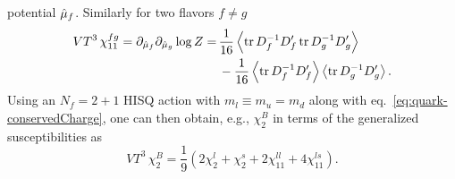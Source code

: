 potential $\hat{\mu}_f$. Similarly for two flavors $f\neq g$ 
\begin{equation}\begin{aligned}
  VT^3\,\chi_{11}^{fg} =\partial_{\muh_f}\partial_{\muh_g}\log Z
                 = \,& \frac{1}{16}\ev{\tr D_f^{-1}D_f'\tr D_g^{-1}D_g'} \\
                   & -\frac{1}{16}\ev{\tr D_f^{-1}D_f'}\ev{\tr D_g^{-1}D_g'}.
\end{aligned}\end{equation}
Using an $N_f=2+1$ HISQ action with $m_l\equiv m_u=m_d$ along with 
eq.~\eqref{eq:quark-conservedCharge}, one can then obtain, e.g., $\chi_2^B$ in
terms of the generalized susceptibilities as
\begin{equation}
  VT^3\,\chi_2^B=\frac{1}{9}\left(2\chi_2^l+\chi_2^s+2\chi_{11}^{ll}+4\chi_{11}^{ls}\right).
\end{equation}




